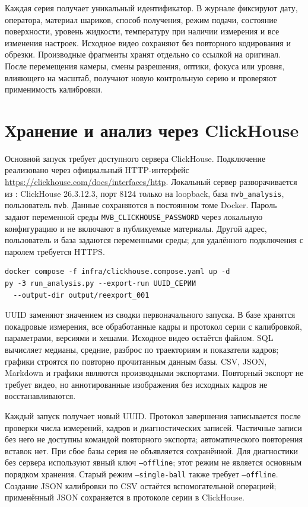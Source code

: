 \documentclass[12pt,a4paper]{article}
\begin{document}
Каждая серия получает уникальный идентификатор. В журнале фиксируют дату, оператора, материал шариков, способ получения, режим подачи, состояние поверхности, уровень жидкости, температуру при наличии измерения и все изменения настроек. Исходное видео сохраняют без повторного кодирования и обрезки. Производные фрагменты хранят отдельно со ссылкой на оригинал. После перемещения камеры, смены разрешения, оптики, фокуса или уровня, влияющего на масштаб, получают новую контрольную серию и проверяют применимость калибровки.

\section{Хранение и анализ через ClickHouse}
Основной запуск требует доступного сервера ClickHouse. Подключение реализовано через официальный HTTP-интерфейс \url{https://clickhouse.com/docs/interfaces/http}. Локальный сервер разворачивается из : ClickHouse 26.3.12.3, порт 8124 только на loopback, база \texttt{mvb\_analysis}, пользователь \texttt{mvb}. Данные сохраняются в постоянном томе Docker. Пароль задают переменной среды \texttt{MVB\_CLICKHOUSE\_PASSWORD} через локальную конфигурацию и не включают в публикуемые материалы. Другой адрес, пользователь и база задаются переменными среды; для удалённого подключения с паролем требуется HTTPS.
\begin{verbatim}
docker compose -f infra/clickhouse.compose.yaml up -d
py -3 run_analysis.py --export-run UUID_СЕРИИ
  --output-dir output/reexport_001
\end{verbatim}
UUID заменяют значением из сводки первоначального запуска. В базе хранятся покадровые измерения, все обработанные кадры и протокол серии с калибровкой, параметрами, версиями и хешами. Исходное видео остаётся файлом. SQL вычисляет медианы, средние, разброс по траекториям и показатели кадров; графики строятся по повторно прочитанным данным базы. CSV, JSON, Markdown и графики являются производными экспортами. Повторный экспорт не требует видео, но аннотированные изображения без исходных кадров не восстанавливаются.

Каждый запуск получает новый UUID. Протокол завершения записывается после проверки числа измерений, кадров и диагностических записей. Частичные записи без него не доступны командой повторного экспорта; автоматического повторения вставок нет. При сбое базы серия не объявляется сохранённой. Для диагностики без сервера используют явный ключ \texttt{--offline}; этот режим не является основным порядком хранения. Старый режим \texttt{--single-ball} также требует \texttt{--offline}. Создание JSON калибровки по CSV остаётся вспомогательной операцией; применённый JSON сохраняется в протоколе серии в ClickHouse.
\end{document}
